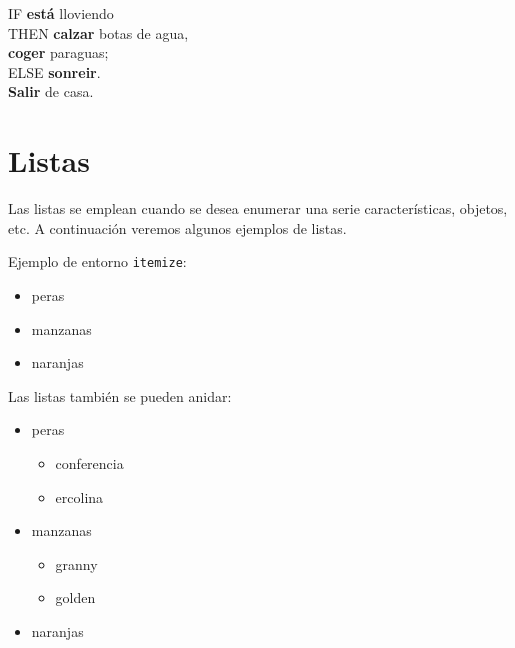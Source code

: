 \documentclass[11pt,a4paper]{article}
\begin{document}
\begin{tabbing}
	IF \= \textbf{está} lloviendo                \\
	\> THEN \= \textbf{calzar} botas de agua, \\
	\>      \> \textbf{coger} paraguas;       \\
	\> ELSE \> \textbf{sonreir}.              \\
	\textbf{Salir} de casa.
\end{tabbing}







\section{Listas}
\label{sec:listas} %


Las listas se emplean cuando se desea enumerar una serie características, objetos, etc. A continuación veremos algunos ejemplos de listas.

\noindent Ejemplo de entorno {\tt itemize}:

\begin{itemize}
	\item peras
	\item manzanas
	\item naranjas
\end{itemize}


Las listas también se pueden anidar:
\begin{itemize}
	\item peras
	\begin{itemize}
		\item conferencia
		\item ercolina
	\end{itemize}
	\item manzanas
	\begin{itemize}
		\item granny
		\item golden 
	\end{itemize}
	\item naranjas
\end{itemize}
\end{document}
